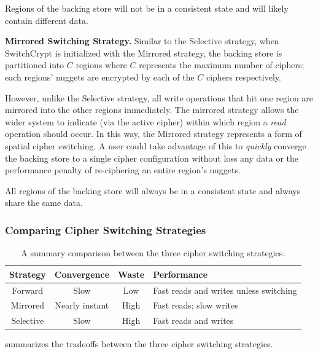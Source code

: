 Regions of the backing store will not be in a consistent state and will likely
contain different data.

\textbf{Mirrored Switching Strategy.} Similar to the Selective strategy, when
SwitchCrypt is initialized with the Mirrored strategy, the backing store is
partitioned into $C$ regions where $C$ represents the maximum number of ciphers;
each regions' nuggets are encrypted by each of the $C$ ciphers respectively.

However, unlike the Selective strategy, all write operations that hit one region
are mirrored into the other regions immediately. The mirrored strategy allows
the wider system to indicate (via the active cipher) within which region a
\emph{read} operation should occur. In this way, the Mirrored strategy
represents a form of spatial cipher switching. A user could take advantage of
this to \emph{quickly} converge the backing store to a single cipher
configuration without loss any data or the performance penalty of re-ciphering
an entire region's nuggets.

All regions of the backing store will always be in a consistent state and always
share the same data.

\subsubsection{Comparing Cipher Switching Strategies}

\begin{table}[ht]
   \begin{tabular}{@{}|c|c|c|C{25mm}|@{}}
      \toprule
      \textbf{Strategy} & \textbf{Convergence} & \textbf{Waste} & \textbf{Performance} \\ \midrule
      Forward   & Slow           & Low  & Fast reads and writes unless switching \\
      \hline
      Mirrored  & Nearly instant & High & Fast reads; slow writes \\
      \hline
      Selective & Slow           & High & Fast reads and writes  \\
      \hline
   \end{tabular}
   \caption{A summary comparison between the three cipher switching strategies.}
   \label{tbl:strategies-advantages}
\end{table}

 summarizes the tradeoffs between the three cipher
switching strategies.

